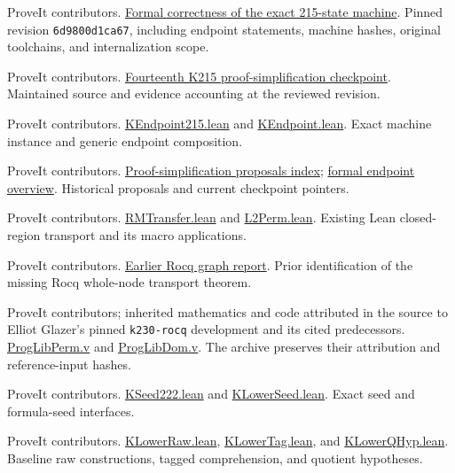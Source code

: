 \documentclass[11pt,letterpaper]{article}
\theoremstyle{definition}\newtheorem{definition}[theorem]{Definition}
\theoremstyle{remark}\newtheorem{remark}[theorem]{Remark}
\newcommand{\code}[1]{\texttt{\small #1}}
\newcommand{\gh}[2]{\href{https://github.com/VladimirReshetnikov/ProveIt/blob/6d9800d1ca67c52db0eb6e1c65df7b5cab9cdb95/#1}{#2}}
\begin{document}
\clearpage
\begin{thebibliography}{9}
\small
{} ProveIt contributors.
\gh{Computability/BusyBeaver/Research/ZFC/k225-formal/verification/k215/README.md}{Formal correctness of the exact 215-state machine}.
Pinned revision \code{6d9800d1ca67}, including endpoint statements, machine hashes, original toolchains, and internalization scope.

 ProveIt contributors.
\gh{Computability/BusyBeaver/Research/ZFC/k225-formal/verification/k215/simplification/phase14/README.md}{Fourteenth K215 proof-simplification checkpoint}.
Maintained source and evidence accounting at the reviewed revision.

 ProveIt contributors.
\gh{Computability/BusyBeaver/Lean/BusyBeaver/ZFC/KEndpoint215.lean}{KEndpoint215.lean} and
\gh{Computability/BusyBeaver/Lean/BusyBeaver/ZFC/KEndpoint.lean}{KEndpoint.lean}.
Exact machine instance and generic endpoint composition.

 ProveIt contributors.
\gh{Computability/BusyBeaver/Research/ZFC/k225-formal/verification/k215/simplification/proposals/README.md}{Proof-simplification proposals index};
\gh{Computability/BusyBeaver/Research/ZFC/k225-formal/README.md}{formal endpoint overview}.
Historical proposals and current checkpoint pointers.

 ProveIt contributors.
\gh{Computability/BusyBeaver/Lean/BusyBeaver/ZFC/RMTransfer.lean}{RMTransfer.lean} and
\gh{Computability/BusyBeaver/Lean/BusyBeaver/ZFC/L2Perm.lean}{L2Perm.lean}.
Existing Lean closed-region transport and its macro applications.

 ProveIt contributors.
\gh{Computability/BusyBeaver/Research/ZFC/k225-formal/verification/k215/simplification/proposals/k215-simplification-3/rocq/CFG_REPORT.md}{Earlier Rocq graph report}.
Prior identification of the missing Rocq whole-node transport theorem.

 ProveIt contributors; inherited mathematics and code attributed in the source to Elliot Glazer's pinned \code{k230-rocq} development and its cited predecessors.
\gh{Computability/BusyBeaver/Research/ZFC/k225-formal/rocq/rocq-extension/coq/215/ProgLibPerm.v}{ProgLibPerm.v} and
\gh{Computability/BusyBeaver/Research/ZFC/k225-formal/rocq/rocq-extension/coq/217/ProgLibDom.v}{ProgLibDom.v}.
The archive preserves their attribution and reference-input hashes.

 ProveIt contributors.
\gh{Computability/BusyBeaver/Lean/BusyBeaver/ZFC/KSeed222.lean}{KSeed222.lean} and
\gh{Computability/BusyBeaver/Lean/BusyBeaver/ZFC/KLowerSeed.lean}{KLowerSeed.lean}.
Exact seed and formula-seed interfaces.

 ProveIt contributors.
\gh{Computability/BusyBeaver/Lean/BusyBeaver/ZFC/KLowerRaw.lean}{KLowerRaw.lean},
\gh{Computability/BusyBeaver/Lean/BusyBeaver/ZFC/KLowerTag.lean}{KLowerTag.lean}, and
\gh{Computability/BusyBeaver/Lean/BusyBeaver/ZFC/KLowerQHyp.lean}{KLowerQHyp.lean}.
Baseline raw constructions, tagged comprehension, and quotient hypotheses.
\end{thebibliography}
\end{document}
